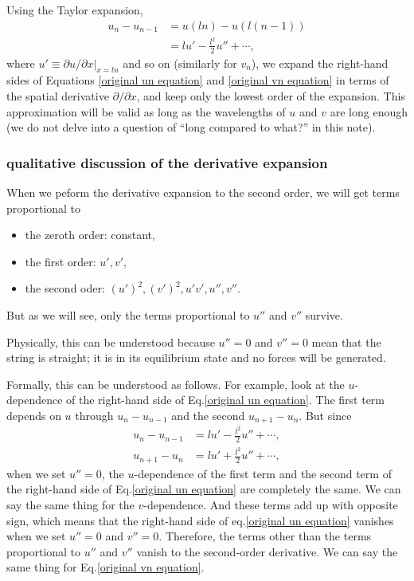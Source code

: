 \documentclass{article}
\begin{document}
Using the Taylor expansion, 
\begin{align}
    u_n - u_{n-1} &= u(ln) - u(l(n-1)) \nonumber \\
    &= lu' - \frac{l^2}{2}u'' + \cdots,
\end{align}
where $u'\equiv \partial u/\partial x |_{x=ln}$ and so on (similarly for $v_n$), we expand the right-hand sides of Equations \eqref{original un equation} and \eqref{original vn equation} in terms of the spatial derivative $\partial/\partial x$, and keep only the lowest order of the expansion.  This approximation will be valid as long as the wavelengths of $u$ and $v$ are long enough (we do not delve into a question of ``long compared to what?'' in this note).

\subsubsection{qualitative discussion of the derivative expansion}
When we peform the derivative expansion to the second order, we will get terms proportional to
\begin{itemize}
\item the zeroth order: constant, 
\item the first order: $u', v'$,
\item the second oder: $(u')^2, (v')^2, u'v', u'', v''$.  
\end{itemize}
But as we will see, only the terms proportional to $u''$ and $v''$ survive.  

Physically, this can be understood because $u''=0$ and $v''=0$ mean that the string is straight; it is in its equilibrium state and no forces will be generated.  

Formally, this can be understood as follows.  For example, look at the $u$-dependence of the right-hand side of Eq.\eqref{original un equation}.  The first term depends on $u$ through $u_n - u_{n-1}$ and the second $u_{n+1} - u_n$.  But since  
\begin{align}
    u_n - u_{n-1} &= lu' - \frac{l^2}{2}u'' + \cdots, \\
    u_{n+1} - u_n &= lu' + \frac{l^2}{2}u'' + \cdots,
\end{align}
when we set $u''=0$, the $u$-dependence of the first term and the second term of the right-hand side of Eq.\eqref{original un equation} are completely the same. We can say the same thing for the $v$-dependence.  And these terms add up with opposite sign, which means that the right-hand side of eq.\eqref{original un equation} vanishes when we set $u''=0$ and $v''=0$.  Therefore, the terms other than the terms proportional to $u''$ and $v''$ vanish to the second-order derivative.  We can say the same thing for Eq.\eqref{original vn equation}.  
\end{document}
